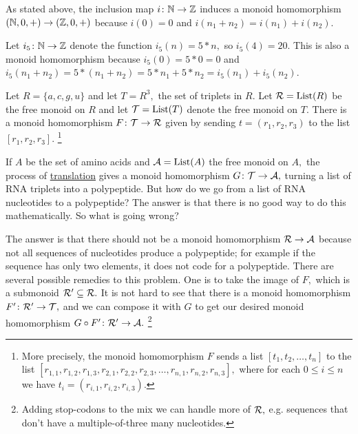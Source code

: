 \documentclass[CT4S-EN-RU]{subfiles}
\begin{document}
\begin{exampleENG}[From $\NN$ to $\ZZ$]\label{ex:nat to int}
As stated above, the inclusion map $i\colon{\mathbb N}\rightarrow{\mathbb Z}$ induces a monoid homomorphism $({\mathbb N},0,+)\rightarrow({\mathbb Z},0,+)$ because $i(0)=0$ and $i(n_1+n_2)=i(n_1)+i(n_2).$

Let $i_5\colon{\mathbb N}\rightarrow{\mathbb Z}$ denote the function $i_5(n)=5*n,$ so $i_5(4)=20.$ This is also a monoid homomorphism because $i_5(0)=5*0=0$ and $i_5(n_1+n_2)=5*(n_1+n_2)=5*n_1+5*n_2=i_5(n_1)+i_5(n_2).$
\end{exampleENG}

\begin{exampleRUS}[From $\NN$ to $\ZZ$]\label{ex:nat to int}
\end{exampleRUS}

\begin{applicationENG}\label{app:RNA reader 1}
Let $R=\{a,c,g,u\}$ and let $T=R^3,$ the set of triplets in $R.$ Let $\mathcal{R}=\textnormal{List}(R)$ be the free monoid on $R$ and let $\mathcal{T}=\textnormal{List}(T)$ denote the free monoid on $T.$ There is a monoid homomorphism $F\colon\mathcal{T}\rightarrow\mathcal{R}$ given by sending $t=(r_1,r_2,r_3)$ to the list $[r_1,r_2,r_3].$
\footnote{More precisely, the monoid homomorphism $F$ sends a list $[t_1,t_2,\ldots,t_n]$ to the list $[r_{1,1},r_{1,2},r_{1,3},r_{2,1},r_{2,2},r_{2,3},\ldots,r_{n,1},r_{n,2},r_{n,3}],$ where for each $0\leq i\leq n$ we have $t_i=(r_{i,1},r_{i,2},r_{i,3}).$}

If $A$ be the set of amino acids and $\mathcal{A}=\textnormal{List}(A)$ the free monoid on $A,$ the process of \href{http://en.wikipedia.org/wiki/Translation_(biology)}{\text translation} gives a monoid homomorphism $G\colon\mathcal{T}\rightarrow\mathcal{A},$ turning a list of RNA triplets into a polypeptide. But how do we go from a list of RNA nucleotides to a polypeptide? The answer is that there is no good way to do this mathematically. So what is going wrong?

The answer is that there should not be a monoid homomorphism $\mathcal{R}\rightarrow\mathcal{A}$ because not all sequences of nucleotides produce a polypeptide; for example if the sequence has only two elements, it does not code for a polypeptide. There are several possible remedies to this problem. One is to take the image of $F,$ which is a submonoid $\mathcal{R}'\subseteq\mathcal{R}.$ It is not hard to see that there is a monoid homomorphism $F'\colon\mathcal{R}'\rightarrow\mathcal{T},$ and we can compose it with $G$ to get our desired monoid homomorphism $G\circ F'\colon\mathcal{R}'\rightarrow\mathcal{A}.$
\footnote{Adding stop-codons to the mix we can handle more of $\mathcal{R},$ e.g. sequences that don't have a multiple-of-three many nucleotides.}
\end{applicationENG}
\end{document}
